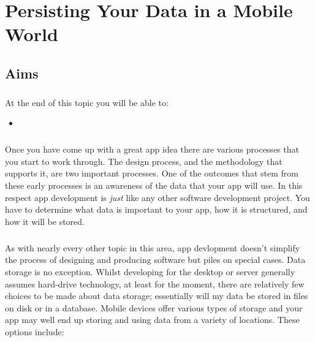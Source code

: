 \chapter{Persisting Your Data in a Mobile World}

\section{Aims}
\paragraph{} At the end of this topic you will be able to:

\begin{itemize}
\item 
\end{itemize}

\paragraph{} Once you have come up with a great app idea there are various processes that you start to work through. The design process, and the methodology that supports it, are two important processes. One of the outcomes that stem from these early processes is an awareness of the data that your app will use. In this respect app development is {\emph{just}} like any other software development project. You have to determine what data is important to your app, how it is structured, and how it will be stored.

\paragraph{} As with nearly every other topic in this area, app devlopment doesn't simplify the process of designing and producing software but piles on special cases. Data storage is no exception. Whilst developing for the desktop or server generally assumes hard-drive technology, at least for the moment, there are relatively few choices to be made about data storage; essentially will my data be stored in files on disk or in a database. Mobile devices offer various types of storage and your app may well end up storing and using data from a variety of locations. These options include:

